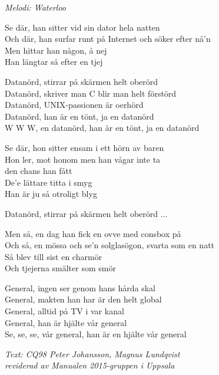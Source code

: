 {\footnotesize\textit{Melodi: Waterloo}}\par
\vspace{10pt}
Se där, han sitter vid sin dator hela natten\\
Och där, han surfar runt på Internet och söker efter nå'n\\
Men hittar han någon, å nej\\
Han längtar så efter en tjej\par
\vspace{10pt}
Datanörd, stirrar på skärmen helt oberörd\\
Datanörd, skriver man C blir man helt förstörd\\
Datanörd, UNIX-passionen är oerhörd\\
Datanörd, han är en tönt, ja en datanörd\\
W W W, en datanörd, han är en tönt, ja en datanörd\par
\newpage
Se där, hon sitter ensam i ett hörn av baren\\
Hon ler, mot honom men han vågar inte ta\\
den chans han fått\\
De'e lättare titta i smyg\\
Han är ju så otroligt blyg\par
\vspace{10pt}
Datanörd, stirrar på skärmen helt oberörd ...\par
\vspace{10pt}
Men så, en dag han fick en ovve med consbox på\\
Och så, en mössa och se'n solglasögon, svarta som en natt\\
Så blev till sist en charmör\\
Och tjejerna smälter som smör\par
\vspace{10pt}
General, ingen ser genom hans hårda skal\\
General, makten han har är den helt global\\
General, alltid på TV i var kanal\\
General, han är hjälte vår general\\
Se, se, se, vår general, han är en hjälte vår general\par
\vspace{10pt}
{\footnotesize\textit{Text: CQ98 Peter Johansson, Magnus Lundqvist \\
					 reviderad av Manualen 2015-gruppen i Uppsala}}
